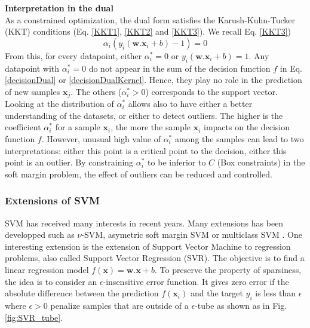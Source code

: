\noindent \textbf{Interpretation in the dual} \\
As a constrained optimization, the dual form satisfies the
Karush-Kuhn-Tucker (KKT) conditions (Eq. \ref{KKT1}, \ref{KKT2} and \ref{KKT3}). We recall Eq. \ref{KKT3})
\begin{equation*}
	\alpha_i (y_i(\textbf{w}.\textbf{x}_i+b)-1) = 0
\end{equation*}
From this, for every datapoint, either $\alpha_i^* = 0$ or $y_i(\textbf{w}.\textbf{x}_i+b) = 1$. Any datapoint with $\alpha_i^* = 0$ do not appear in the sum of the decision function $f$ in Eq. \ref{decisionDual} or \ref{decisionDualKernel}. Hence, they play no role in the prediction of new samples $\textbf{x}_j$. The others ($\alpha_i^* > 0$) corresponds to the support vector. Looking at the distribution of $\alpha_i^*$ allows also to have either a better understanding of the datasets, or either to detect outliers. The higher is the coefficient $\alpha_i^*$ for a sample $\textbf{x}_i$, the more the sample $\textbf{x}_i$ impacts on the decision function $f$. However, unusual high value of $\alpha_i^*$ among the samples can lead to two interpretations: either this point is a critical point to the decision, either this point is an outlier. By constraining $\alpha_i^*$ to be inferior to $C$ (Box constraints) in the soft margin problem, the effect of outliers can be reduced and controlled. 




\subsubsection{Extensions of SVM}
SVM has received many interests in recent years. Many extensions has been developped such as $\nu$-SVM, asymetric soft margin SVM or multiclass SVM . One interesting extension is the extension of Support Vector Machine to regression problems, also called Support Vector Regression (SVR). The objective is to find a linear regression model $f(\textbf{x})=\textbf{w}.\textbf{x}+b$. To preserve the property of sparsiness, the idea is to consider an $\epsilon$-insensitive error function. It gives zero error if the absolute difference between
the prediction $f(\textbf{x}_i)$ and the target $y_i$ is less than $\epsilon$ where $\epsilon > 0$ penalize samples that are outside of a $\epsilon$-tube as shown as in Fig. \ref{fig:SVR_tube}.

